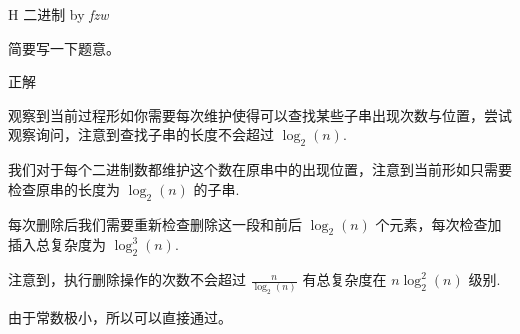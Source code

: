 \begin{frame}{H 二进制 {by \itshape fzw}}

	简要写一下题意。

\end{frame}

\begin{frame}{正解}

	观察到当前过程形如你需要每次维护使得可以查找某些子串出现次数与位置，尝试观察询问，注意到查找子串的长度不会超过 $\log_2 (n)$. \pause

	我们对于每个二进制数都维护这个数在原串中的出现位置，注意到当前形如只需要检查原串的长度为 $\log_2(n)$ 的子串. \pause

	每次删除后我们需要重新检查删除这一段和前后 $\log_2(n)$ 个元素，每次检查加插入总复杂度为 $\log_2^3(n)$. \pause

	注意到，执行删除操作的次数不会超过 $\frac n{\log_2(n)}$ 有总复杂度在 $n\log_2^2(n)$ 级别. \pause

	由于常数极小，所以可以直接通过。

\end{frame}
